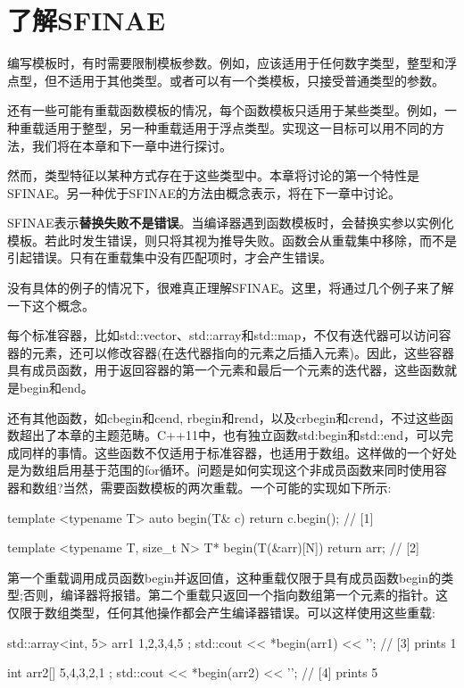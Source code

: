 \section{了解SFINAE}
编写模板时，有时需要限制模板参数。例如，应该适用于任何数字类型，整型和浮点型，但不适用于其他类型。或者可以有一个类模板，只接受普通类型的参数。

还有一些可能有重载函数模板的情况，每个函数模板只适用于某些类型。例如，一种重载适用于整型，另一种重载适用于浮点类型。实现这一目标可以用不同的方法，我们将在本章和下一章中进行探讨。

然而，类型特征以某种方式存在于这些类型中。本章将讨论的第一个特性是SFINAE。另一种优于SFINAE的方法由概念表示，将在下一章中讨论。

SFINAE表示\textbf{替换失败不是错误}。当编译器遇到函数模板时，会替换实参以实例化模板。若此时发生错误，则只将其视为推导失败。函数会从重载集中移除，而不是引起错误。只有在重载集中没有匹配项时，才会产生错误。

没有具体的例子的情况下，很难真正理解SFINAE。这里，将通过几个例子来了解一下这个概念。

每个标准容器，比如std::vector、std::array和std::map，不仅有迭代器可以访问容器的元素，还可以修改容器(在迭代器指向的元素之后插入元素)。因此，这些容器具有成员函数，用于返回容器的第一个元素和最后一个元素的迭代器，这些函数就是begin和end。

还有其他函数，如cbegin和cend, rbegin和rend，以及crbegin和crend，不过这些函数超出了本章的主题范畴。C++11中，也有独立函数std:begin和std::end，可以完成同样的事情。这些函数不仅适用于标准容器，也适用于数组。这样做的一个好处是为数组启用基于范围的for循环。问题是如何实现这个非成员函数来同时使用容器和数组?当然，需要函数模板的两次重载。一个可能的实现如下所示:

\begin{cpp}
template <typename T>
auto begin(T& c) { return c.begin(); } // [1]

template <typename T, size_t N>
T* begin(T(&arr)[N]) {return arr; } // [2]
\end{cpp}

第一个重载调用成员函数begin并返回值，这种重载仅限于具有成员函数begin的类型;否则，编译器将报错。第二个重载只返回一个指向数组第一个元素的指针。这仅限于数组类型，任何其他操作都会产生编译器错误。可以这样使用这些重载:

\begin{cpp}
std::array<int, 5> arr1{ 1,2,3,4,5 };
std::cout << *begin(arr1) << '\n'; // [3] prints 1

int arr2[]{ 5,4,3,2,1 };
std::cout << *begin(arr2) << '\n'; // [4] prints 5
\end{cpp}

